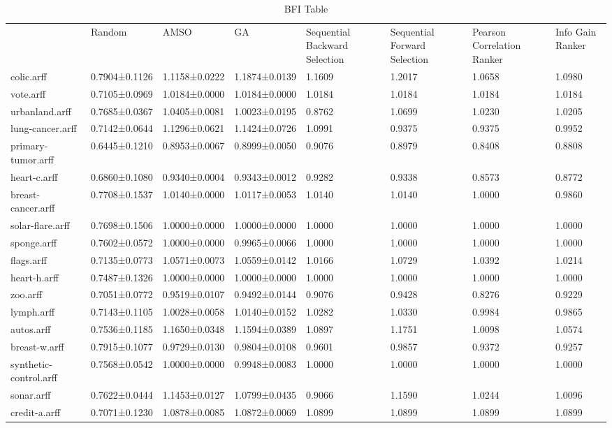 \begin{table*}[h]
\caption{BFI Table}
\label{tbl:bfi}\begin{tabular}{llllllll}
\noalign{\smallskip}\hline\noalign{\smallskip}
&Random&AMSO&GA&Sequential Backward Selection&Sequential Forward Selection&Pearson Correlation Ranker&Info Gain Ranker\\\noalign{\smallskip}\hline
colic.arff&0.7904±0.1126&1.1158±0.0222&1.1874±0.0139&1.1609&1.2017&1.0658&1.0980\\
vote.arff&0.7105±0.0969&1.0184±0.0000&1.0184±0.0000&1.0184&1.0184&1.0184&1.0184\\
urbanland.arff&0.7685±0.0367&1.0405±0.0081&1.0023±0.0195&0.8762&1.0699&1.0230&1.0205\\
lung-cancer.arff&0.7142±0.0644&1.1296±0.0621&1.1424±0.0726&1.0991&0.9375&0.9375&0.9952\\
primary-tumor.arff&0.6445±0.1210&0.8953±0.0067&0.8999±0.0050&0.9076&0.8979&0.8408&0.8808\\
heart-c.arff&0.6860±0.1080&0.9340±0.0004&0.9343±0.0012&0.9282&0.9338&0.8573&0.8772\\
breast-cancer.arff&0.7708±0.1537&1.0140±0.0000&1.0117±0.0053&1.0140&1.0140&1.0000&0.9860\\
solar-flare.arff&0.7698±0.1506&1.0000±0.0000&1.0000±0.0000&1.0000&1.0000&1.0000&1.0000\\
sponge.arff&0.7602±0.0572&1.0000±0.0000&0.9965±0.0066&1.0000&1.0000&1.0000&1.0000\\
flags.arff&0.7135±0.0773&1.0571±0.0073&1.0559±0.0142&1.0166&1.0729&1.0392&1.0214\\
heart-h.arff&0.7487±0.1326&1.0000±0.0000&1.0000±0.0000&1.0000&1.0000&1.0000&1.0000\\
zoo.arff&0.7051±0.0772&0.9519±0.0107&0.9492±0.0144&0.9076&0.9428&0.8276&0.9229\\
lymph.arff&0.7143±0.1105&1.0028±0.0058&1.0140±0.0152&1.0282&1.0330&0.9984&0.9865\\
autos.arff&0.7536±0.1185&1.1650±0.0348&1.1594±0.0389&1.0897&1.1751&1.0098&1.0574\\
breast-w.arff&0.7915±0.1077&0.9729±0.0130&0.9804±0.0108&0.9601&0.9857&0.9372&0.9257\\
synthetic-control.arff&0.7568±0.0542&1.0000±0.0000&0.9948±0.0083&1.0000&1.0000&1.0000&1.0000\\
sonar.arff&0.7622±0.0444&1.1453±0.0127&1.0799±0.0435&0.9066&1.1590&1.0244&1.0096\\
credit-a.arff&0.7071±0.1230&1.0878±0.0085&1.0872±0.0069&1.0899&1.0899&1.0899&1.0899\\

\end{tabular}
\end{table*}
